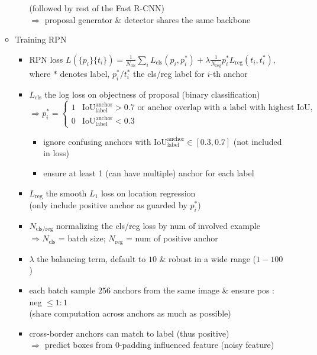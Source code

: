 \begin{itemize}
\begin{itemize}
\begin{itemize}
		(followed by rest of the Fast R-CNN) \\
		$\Rightarrow$ proposal generator \& detector shares the same backbone
		\end{itemize}
	\item Training RPN
		\begin{itemize}
		\item RPN loss $L(\{p_i\} \{t_i\}) = \frac 1{N_\text{cls}} \sum_i L_\text{cls}(p_i, p_i^*) + \lambda \frac 1 {N_\text{reg}} p_i^* L_\text{reg}(t_i,t_i^*)$, \\
		where $*$ denotes label, $p^*_i / t^*_i$ the cls/reg label for $i$-th anchor
		\item $L_\text{cls}$ the log loss on objectness of proposal (binary classification) \\
		$\Rightarrow p_i^* = \begin{cases} 1 & \text{IoU}^\text{anchor}_\text{label} > 0.7 \text{ or anchor overlap with a label with highest IoU}, \\ 0 & \text{IoU}^\text{anchor}_\text{label} < 0.3 \end{cases}$
			\begin{itemize}
			\item ignore confusing anchors with $\text{IoU}^\text{anchor}_\text{label} \in [0.3, 0.7]$ (not included in loss)
			\item ensure at least 1 (can have multiple) anchor for each label
			\end{itemize}
		\item $L_\text{reg}$ the smooth $L_1$ loss on location regression \\ 
		(only include positive anchor as guarded by $p^*_i$)
		\item $N_\text{cls/reg}$ normalizing the cls/reg loss by num of involved example \\
		$\Rightarrow N_\text{cls}$ = batch size; $N_\text{reg}$ = num of positive anchor
		\item $\lambda$ the balancing term, default to $10$ \& robust in a wide range ($1-100$)
		\item each batch sample $256$ anchors from the same image \& ensure pos $:$ neg $\le 1:1$ \\
		(share computation across anchors as much as possible)
		\item cross-border anchors can match to label (thus positive) \\
		$\Rightarrow$ predict boxes from $0$-padding influenced feature (noisy feature) \\

\end{itemize}
\end{itemize}
\end{itemize}
